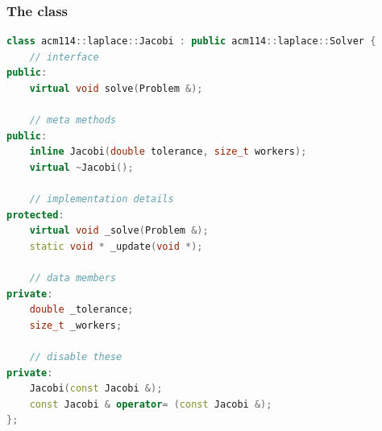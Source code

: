 \begin{frame}[fragile]
% 
  \frametitle{The  class}
%
  \begin{lstlisting}[language=c++]
class acm114::laplace::Jacobi : public acm114::laplace::Solver {
    // interface
public:
    virtual void solve(Problem &);

    // meta methods
public:
    inline Jacobi(double tolerance, size_t workers);
    virtual ~Jacobi();

    // implementation details
protected:
    virtual void _solve(Problem &);
    static void * _update(void *);

    // data members
private:
    double _tolerance;
    size_t _workers;

    // disable these
private:
    Jacobi(const Jacobi &);
    const Jacobi & operator= (const Jacobi &);
};

  \end{lstlisting}
%
\end{frame}

